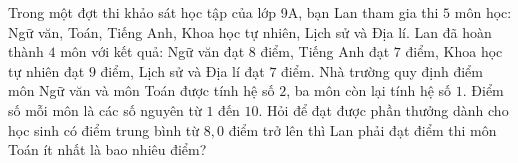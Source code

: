 \begin{bt}%
Trong một đợt thi khảo sát học tập của lớp 9A, bạn Lan tham gia thi $5$ môn học: Ngữ văn, Toán, Tiếng Anh, Khoa học tự nhiên, Lịch sử và Địa lí. Lan đã hoàn thành $4$ môn với kết quả: Ngữ văn đạt $8$ điểm, Tiếng Anh đạt $7$ điểm, Khoa học tự nhiên đạt $9$ điểm, Lịch sử và Địa lí đạt $7$ điểm. Nhà trường quy định điểm môn Ngữ văn và môn Toán được tính hệ số $2$, ba môn còn lại tính hệ số $1$. Điểm số mỗi môn là các số nguyên từ $1$ đến $10$. Hỏi để đạt được phần thưởng dành cho học sinh có điểm trung bình từ $8{,}0$ điểm trở lên thì Lan phải đạt điểm thi môn Toán ít nhất là bao nhiêu điểm?
\end{bt}

